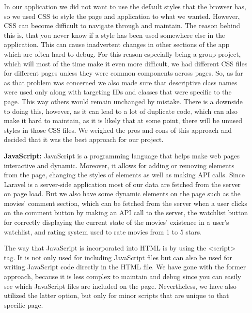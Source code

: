 In our application we did not want to use the default styles that the browser has, so we used CSS to style the page and application to what we wanted.
However, CSS can become difficult to navigate through and maintain.
The reason behind this is, that you never know if a style has been used somewhere else in the application.
This can cause inadvertent changes in other sections of the app which are often hard to debug.
For this reason especially being a group project, which will most of the time make it even more difficult, we had different CSS files for different pages unless they were common components across pages.
So, as far as that problem was concerned we also made sure that descriptive class names were used only along with targeting IDs and classes that were specific to the page.
This way others would remain unchanged by mistake.
There is a downside to doing this, however, as it can lead to a lot of duplicate code, which can also make it hard to maintain, as it is likely that at some point, there will be unused styles in those CSS files.
We weighed the pros and cons of this approach and decided that it was the best approach for our project.\newline

\textbf{JavaScript:} \newline
JavaScript is a programming language that helps make web pages interactive and dynamic. Moreover, it allows for adding or removing elements from the page, changing the styles of elements as well as making API calls.
Since Laravel is a server-side application most of our data are fetched from the server on page load.
But we also have some dynamic elements on the page such as the movies' comment section, which can be fetched from the server when a user clicks on the comment button by making an API call to the server, the watchlist button for correctly displaying the current state of the movies' existence in a user's watchlist, and rating system used to rate movies from 1 to 5 stars.\newline

The way that JavaScript is incorporated into HTML is by using the \textless{}script\textgreater{} tag. It is not only used for including JavaScript files but can also be used for writing JavaScript code directly in the HTML file.
We have gone with the former approach, because it is less complex to maintain and debug since you can easily see which JavaScript files are included on the page.
Nevertheless, we have also utilized the latter option, but only for minor scripts that are unique to that specific page.\newline